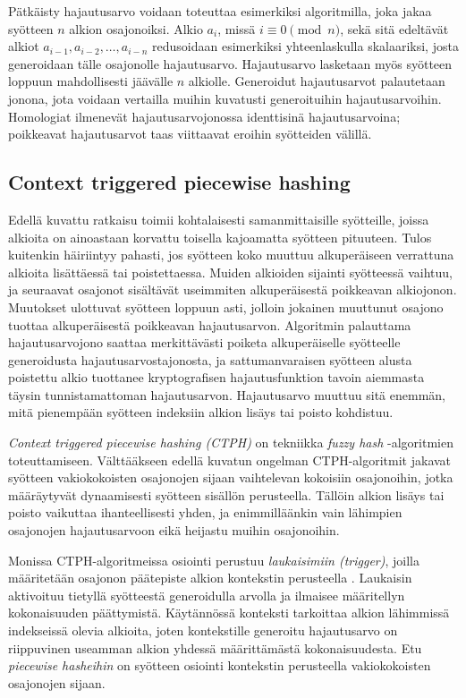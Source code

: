 \documentclass[12pt, a4paper]{article}
\begin{document}
	Pätkäisty hajautusarvo voidaan toteuttaa esimerkiksi
	algoritmilla, joka jakaa syötteen $n$ alkion osajonoiksi.
	Alkio $a_i$, missä $i \equiv 0 \pmod{n}$, sekä sitä
	edeltävät alkiot $a_{i - 1}, a_{i - 2}, \ldots, a_{i - n}$
	redusoidaan esimerkiksi yhteenlaskulla skalaariksi, josta generoidaan
	tälle osajonolle hajautusarvo. Hajautusarvo lasketaan myös syötteen
	loppuun mahdollisesti jäävälle $n$ alkiolle. Generoidut hajautusarvot
	palautetaan jonona, jota voidaan vertailla
	muihin kuvatusti generoituihin hajautusarvoihin. Homologiat
	ilmenevät hajautusarvojonossa identtisinä hajautusarvoina; poikkeavat
	hajautusarvot taas viittaavat eroihin syötteiden välillä.

	\subsection*{Context triggered piecewise hashing}

	Edellä kuvattu ratkaisu toimii kohtalaisesti samanmittaisille
	syötteille, joissa alkioita on ainoastaan korvattu toisella
	kajoamatta syötteen pituuteen.
	Tulos kuitenkin häiriintyy pahasti, jos
	syötteen koko muuttuu alkuperäiseen verrattuna alkioita
	lisättäessä tai poistettaessa. Muiden alkioiden
	sijainti syötteessä vaihtuu, ja seuraavat osajonot sisältävät
	useimmiten alkuperäisestä poikkeavan alkiojonon.
	Muutokset ulottuvat syötteen loppuun asti, jolloin
	jokainen muuttunut osajono tuottaa alkuperäisestä
	poikkeavan hajautusarvon. Algoritmin palauttama hajautusarvojono
	saattaa merkittävästi poiketa alkuperäiselle syötteelle
	generoidusta hajautusarvostajonosta, ja sattumanvaraisen syötteen
	alusta poistettu alkio tuottanee kryptografisen hajautusfunktion
	tavoin aiemmasta täysin tunnistamattoman hajautusarvon.
	Hajautusarvo muuttuu sitä enemmän, mitä pienempään syötteen
	indeksiin alkion lisäys tai poisto kohdistuu.

	\textit{Context triggered piecewise hashing (CTPH)} on tekniikka
	\textit{fuzzy hash} -algoritmien toteuttamiseen. Välttääkseen edellä kuvatun ongelman
	CTPH-algoritmit jakavat syötteen vakiokokoisten osajonojen
	sijaan vaihtelevan kokoisiin osajonoihin, jotka määräytyvät dynaamisesti
	syötteen sisällön perusteella. Tällöin alkion lisäys tai poisto vaikuttaa
	ihanteellisesti yhden, ja enimmilläänkin vain lähimpien osajonojen
	hajautusarvoon eikä heijastu muihin osajonoihin.

	Monissa CTPH-algoritmeissa osiointi perustuu \textit{laukaisimiin (trigger)},
	joilla määritetään osajonon päätepiste alkion kontekstin perusteella \parencite{IDENT}. Laukaisin
	aktivoituu tietyllä syötteestä generoidulla arvolla ja ilmaisee
	määritellyn kokonaisuuden päättymistä. Käytännössä konteksti tarkoittaa
	alkion lähimmissä indekseissä olevia alkioita, joten kontekstille generoitu 
	hajautusarvo on riippuvinen useamman alkion yhdessä määrittämästä kokonaisuudesta.
	Etu \textit{piecewise hasheihin} on syötteen osiointi
	kontekstin perusteella vakiokokoisten osajonojen sijaan.
\end{document}
